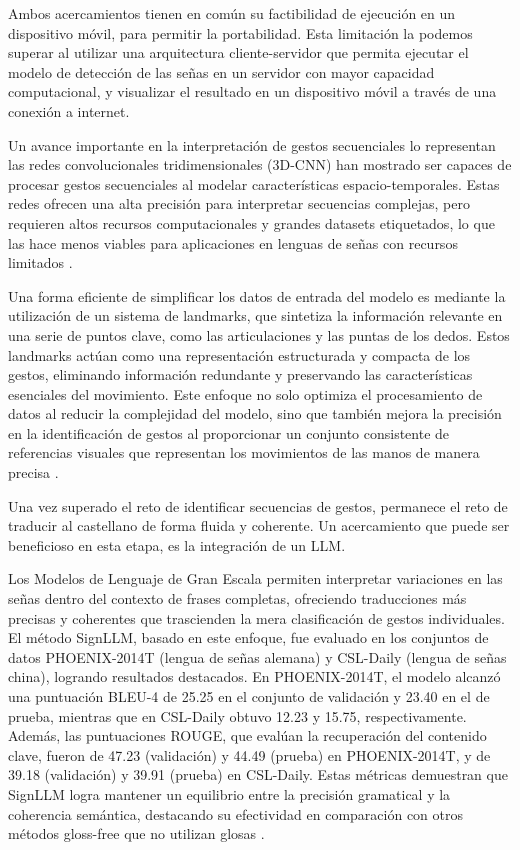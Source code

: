 \documentclass{article}
\begin{document}
Ambos acercamientos tienen en común su factibilidad de ejecución en un dispositivo móvil, para permitir la portabilidad. Esta limitación la podemos superar al utilizar una arquitectura cliente-servidor que permita ejecutar el modelo de detección de las señas en un servidor con mayor capacidad computacional, y visualizar el resultado en un dispositivo móvil a través de una conexión a internet.

Un avance importante en la interpretación de gestos secuenciales lo representan las redes convolucionales tridimensionales (3D-CNN) han mostrado ser capaces de procesar gestos secuenciales al modelar características espacio-temporales. Estas redes ofrecen una alta precisión para interpretar secuencias complejas, pero requieren altos recursos computacionales y grandes datasets etiquetados, lo que las hace menos viables para aplicaciones en lenguas de señas con recursos limitados \cite{cita9}.

Una forma eficiente de simplificar los datos de entrada del modelo es mediante la utilización de un sistema de landmarks, que sintetiza la información relevante en una serie de puntos clave, como las articulaciones y las puntas de los dedos. Estos landmarks actúan como una representación estructurada y compacta de los gestos, eliminando información redundante y preservando las características esenciales del movimiento. Este enfoque no solo optimiza el procesamiento de datos al reducir la complejidad del modelo, sino que también mejora la precisión en la identificación de gestos al proporcionar un conjunto consistente de referencias visuales que representan los movimientos de las manos de manera precisa \cite{cita6}.

Una vez superado el reto de identificar secuencias de gestos, permanece el reto de traducir al castellano de forma fluida y coherente. Un acercamiento que puede ser beneficioso en esta etapa, es la integración de un LLM. 

Los Modelos de Lenguaje de Gran Escala permiten interpretar variaciones en las señas dentro del contexto de frases completas, ofreciendo traducciones más precisas y coherentes que trascienden la mera clasificación de gestos individuales. El método SignLLM, basado en este enfoque, fue evaluado en los conjuntos de datos PHOENIX-2014T (lengua de señas alemana) y CSL-Daily (lengua de señas china), logrando resultados destacados. En PHOENIX-2014T, el modelo alcanzó una puntuación BLEU-4 de 25.25 en el conjunto de validación y 23.40 en el de prueba, mientras que en CSL-Daily obtuvo 12.23 y 15.75, respectivamente. Además, las puntuaciones ROUGE, que evalúan la recuperación del contenido clave, fueron de 47.23 (validación) y 44.49 (prueba) en PHOENIX-2014T, y de 39.18 (validación) y 39.91 (prueba) en CSL-Daily. Estas métricas demuestran que SignLLM logra mantener un equilibrio entre la precisión gramatical y la coherencia semántica, destacando su efectividad en comparación con otros métodos gloss-free que no utilizan glosas \cite{cita10}.
\end{document}
